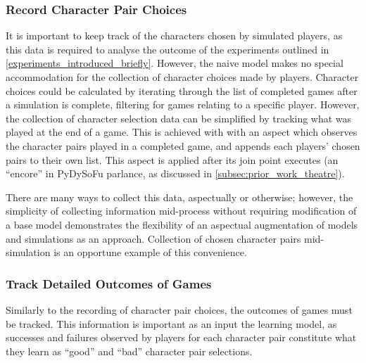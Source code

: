 \subsubsection{Record Character Pair Choices}
It is important to keep track of the characters chosen by simulated players, as
this data is required to analyse the outcome of the experiments outlined in
\cref{experiments_introduced_briefly}. However, the naive model makes no special
accommodation for the collection of character choices made by players. Character
choices could be calculated by iterating through the list of completed games
after a simulation is complete, filtering for games relating to a specific
player. However, the collection of character selection data can be simplified by
tracking what was played at the end of a game. This is achieved with with an
aspect which observes the character pairs played in a completed game, and
appends each players' chosen pairs to their own list. This aspect is applied
after its join point executes (an ``encore'' in PyDySoFu
parlance, as discussed in \cref{subsec:prior_work_theatre}).

There are many ways to collect this data, aspectually or otherwise; however, the
simplicity of collecting information mid-process without requiring modification
of a base model demonstrates the flexibility of an aspectual augmentation of
models and simulations as an approach. Collection of chosen character pairs
mid-simulation is an opportune example of this convenience.

\subsubsection{Track Detailed Outcomes of Games}
\label{subsubsec:detailed_game_outcome_tracking_aspect}

Similarly to the recording of character pair choices, the outcomes of games must
be tracked. This information is important as an input the learning model, as
successes and failures observed by players for each character pair constitute
what they learn as ``good'' and ``bad'' character pair selections. 

